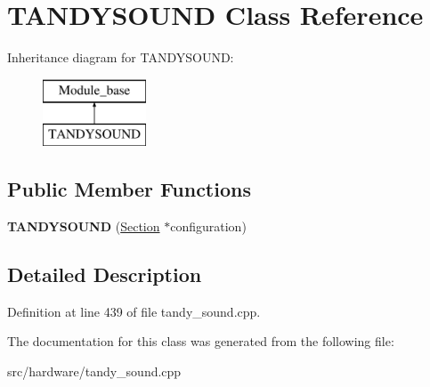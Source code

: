 \hypertarget{classTANDYSOUND}{\section{T\-A\-N\-D\-Y\-S\-O\-U\-N\-D Class Reference}
\label{classTANDYSOUND}
}
Inheritance diagram for T\-A\-N\-D\-Y\-S\-O\-U\-N\-D\-:\begin{figure}[H]
\begin{center}
\leavevmode
\includegraphics[height=2.000000cm]{classTANDYSOUND}
\end{center}
\end{figure}
\subsection*{Public Member Functions}
\begin{DoxyCompactItemize}
\item 
\hypertarget{classTANDYSOUND_a3595cf4fd040eb563c9ffb1dc69944b8}{{\bfseries T\-A\-N\-D\-Y\-S\-O\-U\-N\-D} (\hyperlink{classSection}{Section} $\ast$configuration)}\label{classTANDYSOUND_a3595cf4fd040eb563c9ffb1dc69944b8}

\end{DoxyCompactItemize}


\subsection{Detailed Description}


Definition at line 439 of file tandy\-\_\-sound.\-cpp.



The documentation for this class was generated from the following file\-:\begin{DoxyCompactItemize}
\item 
src/hardware/tandy\-\_\-sound.\-cpp\end{DoxyCompactItemize}
